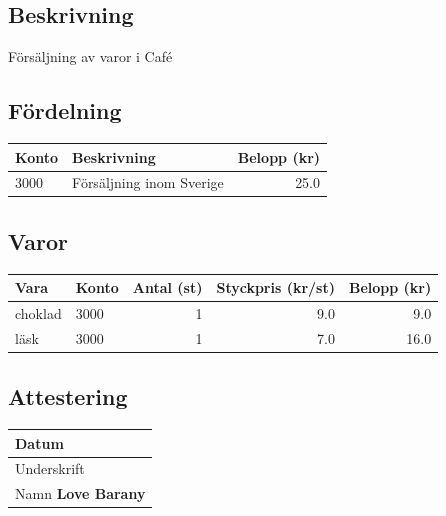 \documentclass{article}
\newcommand{\namn}{Love Barany}
\newcommand{\beskrivning}{Försäljning av varor i Café}\newcommand{\fordelning}{3000 & Försäljning inom Sverige & 25.0\\}\newcommand{\varor}{choklad & 3000 & 1 & 9.0 & 9.0\\läsk & 3000 & 1 & 7.0 & 16.0\\}
\begin{document}
    \subsection*{Beskrivning}
    \beskrivning

    \subsection*{Fördelning}
    \begin{tabular}{p{0.6in}p{2in}r}
        Konto & Beskrivning& Belopp (kr)\\ \hline
        \fordelning
    \end{tabular}

    \subsection*{Varor}
    \begin{longtable}[l]{llrrr}
        Vara & Konto & Antal (st) & Styckpris (kr/st) & Belopp (kr) \\ \hline
        \varor
    \end{longtable}

    \subsection*{Attestering}
    \begin{tabular}{|p{2.5in}|}
        \hline
        {\footnotesize Datum} \newline \\
        \hline
        {\footnotesize Underskrift} \newline \newline\\
        \hline
        {\footnotesize Namn} \newline \textbf{\namn} \\
        \hline
    \end{tabular}
    
\end{document}
